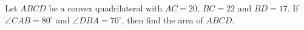Let $ABCD$ be a convex quadrilateral with $AC=20$, $BC=22$ and $BD=17$. If $\angle{CAB}=80^{\circ}$ and $\angle{DBA}=70^{\circ}$, then find the area of $ABCD$.